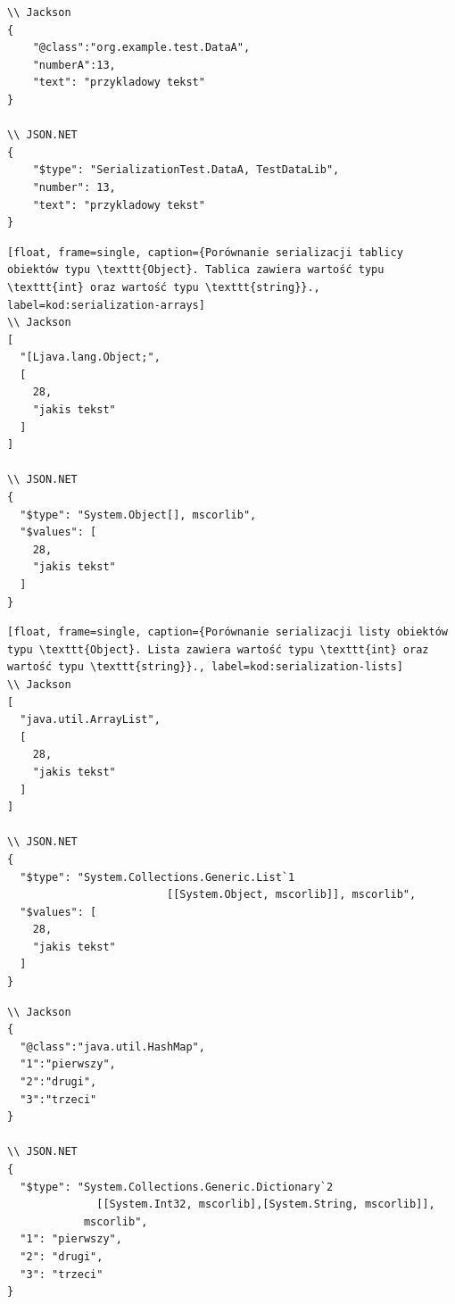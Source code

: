 \begin{lstlisting}[float, frame=single, caption={Porównanie serializacji obiektów typu \texttt{DataA}}, label=kod:serilization-objects]
\\ Jackson
{
    "@class":"org.example.test.DataA",
    "numberA":13,
    "text": "przykladowy tekst"
}

\\ JSON.NET
{
    "$type": "SerializationTest.DataA, TestDataLib",
    "number": 13,
    "text": "przykladowy tekst"
}
\end{lstlisting}

\begin{lstlisting}[float, frame=single, caption={Porównanie serializacji tablicy obiektów typu \texttt{Object}. Tablica zawiera wartość typu \texttt{int} oraz wartość typu \texttt{string}}., label=kod:serialization-arrays]
\\ Jackson
[
  "[Ljava.lang.Object;",
  [
    28,
    "jakis tekst"
  ]
]

\\ JSON.NET
{
  "$type": "System.Object[], mscorlib",
  "$values": [
    28,
    "jakis tekst"
  ]
}
\end{lstlisting}

\begin{lstlisting}[float, frame=single, caption={Porównanie serializacji listy obiektów typu \texttt{Object}. Lista zawiera wartość typu \texttt{int} oraz wartość typu \texttt{string}}., label=kod:serialization-lists]
\\ Jackson
[
  "java.util.ArrayList",
  [
    28,
    "jakis tekst"
  ]
]

\\ JSON.NET
{
  "$type": "System.Collections.Generic.List`1
	                     [[System.Object, mscorlib]], mscorlib",
  "$values": [
    28,
    "jakis tekst"
  ]
}
\end{lstlisting}

\begin{lstlisting}[float, frame=single, caption={Porównanie serializacji słownika/mapy (\emph{dictionary/map}) mapującego wartość typu \texttt{string} do wartości typu \texttt{int} (\texttt{int} jest kluczem).}, label=kod:serialization-dicts]
\\ Jackson
{
  "@class":"java.util.HashMap",
  "1":"pierwszy",
  "2":"drugi",
  "3":"trzeci"
}

\\ JSON.NET
{
  "$type": "System.Collections.Generic.Dictionary`2
	          [[System.Int32, mscorlib],[System.String, mscorlib]],
            mscorlib",
  "1": "pierwszy",
  "2": "drugi",
  "3": "trzeci"
}
\end{lstlisting}

